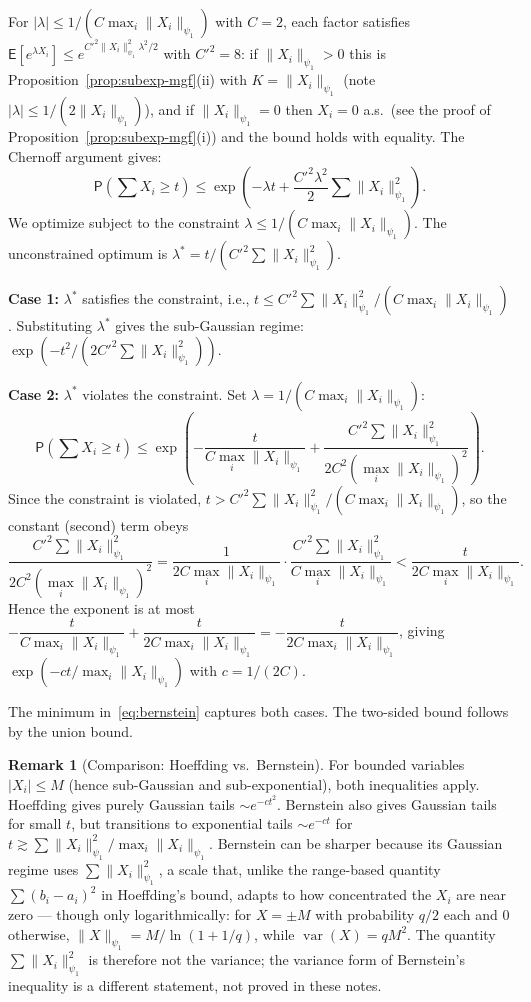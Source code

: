 \documentclass[12pt,a4paper]{article}
\makeatletter
\theoremstyle{definition}
\newtheorem{remark}[theorem]{Remark}
\renewenvironment{proof}[1][\proofname]{\par
  \pushQED{\qed}%
  \normalfont \topsep6\p@\@plus6\p@\relax
  \trivlist
  \item[\hskip\labelsep\bfseries #1\@addpunct{.}]\ignorespaces
}{%
  \popQED\endtrivlist\@endpefalse
}
\newcommand\expc{\mathsf{E}}
\newcommand\prb{\mathsf{P}}
\DeclareMathOperator\var{var}
\makeatother
\begin{document}
\begin{proof}
For $|\lambda| \leqslant 1/(C\max_i\|X_i\|_{\psi_1})$ with $C = 2$, each factor satisfies $\expc[e^{\lambda X_i}] \leqslant e^{C'^2\|X_i\|_{\psi_1}^2\lambda^2/2}$ with $C'^2 = 8$: if $\|X_i\|_{\psi_1} > 0$ this is Proposition~\ref{prop:subexp-mgf}(ii) with $K = \|X_i\|_{\psi_1}$ (note $|\lambda| \leqslant 1/(2\|X_i\|_{\psi_1})$), and if $\|X_i\|_{\psi_1} = 0$ then $X_i = 0$ a.s.\ (see the proof of Proposition~\ref{prop:subexp-mgf}(i)) and the bound holds with equality. The Chernoff argument gives:
\[
\prb\!\left(\sum X_i \geqslant t\right) \leqslant \exp\!\left(-\lambda t + \frac{C'^2\lambda^2}{2}\sum\|X_i\|_{\psi_1}^2\right).
\]
We optimize subject to the constraint $\lambda \leqslant 1/(C\max_i\|X_i\|_{\psi_1})$. The unconstrained optimum is $\lambda^* = t/(C'^2\sum\|X_i\|_{\psi_1}^2)$.

\textbf{Case 1:} $\lambda^*$ satisfies the constraint, i.e., $t \leqslant C'^2\sum\|X_i\|_{\psi_1}^2/(C\max_i\|X_i\|_{\psi_1})$. Substituting $\lambda^*$ gives the sub-Gaussian regime: $\exp(-t^2/(2C'^2\sum\|X_i\|_{\psi_1}^2))$.

\textbf{Case 2:} $\lambda^*$ violates the constraint. Set $\lambda = 1/(C\max_i\|X_i\|_{\psi_1})$:
\[
\prb\!\left(\sum X_i \geqslant t\right) \leqslant \exp\!\left(-\frac{t}{C\max_i\|X_i\|_{\psi_1}} + \frac{C'^2\sum\|X_i\|_{\psi_1}^2}{2C^2(\max_i\|X_i\|_{\psi_1})^2}\right).
\]
Since the constraint is violated, $t > C'^2\sum\|X_i\|_{\psi_1}^2/(C\max_i\|X_i\|_{\psi_1})$, so the constant (second) term obeys
\[
\frac{C'^2\sum\|X_i\|_{\psi_1}^2}{2C^2(\max_i\|X_i\|_{\psi_1})^2} = \frac{1}{2C\max_i\|X_i\|_{\psi_1}}\cdot\frac{C'^2\sum\|X_i\|_{\psi_1}^2}{C\max_i\|X_i\|_{\psi_1}} < \frac{t}{2C\max_i\|X_i\|_{\psi_1}}.
\]
Hence the exponent is at most $-\dfrac{t}{C\max_i\|X_i\|_{\psi_1}} + \dfrac{t}{2C\max_i\|X_i\|_{\psi_1}} = -\dfrac{t}{2C\max_i\|X_i\|_{\psi_1}}$, giving $\exp(-ct/\max_i\|X_i\|_{\psi_1})$ with $c = 1/(2C)$.

The minimum in~\eqref{eq:bernstein} captures both cases. The two-sided bound follows by the union bound.
\end{proof}

\begin{remark}[Comparison: Hoeffding vs.\ Bernstein]
For bounded variables $|X_i| \leqslant M$ (hence sub-Gaussian and sub-exponential), both inequalities apply. Hoeffding gives purely Gaussian tails $\sim e^{-ct^2}$. Bernstein also gives Gaussian tails for small $t$, but transitions to exponential tails $\sim e^{-ct}$ for $t \gtrsim \sum\|X_i\|_{\psi_1}^2/\max_i\|X_i\|_{\psi_1}$. Bernstein can be sharper because its Gaussian regime uses $\sum\|X_i\|_{\psi_1}^2$, a scale that, unlike the range-based quantity $\sum(b_i - a_i)^2$ in Hoeffding's bound, adapts to how concentrated the $X_i$ are near zero --- though only logarithmically: for $X = \pm M$ with probability $q/2$ each and $0$ otherwise, $\|X\|_{\psi_1} = M/\ln(1 + 1/q)$, while $\var(X) = qM^2$. The quantity $\sum\|X_i\|_{\psi_1}^2$ is therefore not the variance; the variance form of Bernstein's inequality is a different statement, not proved in these notes.
\end{remark}
\end{document}
